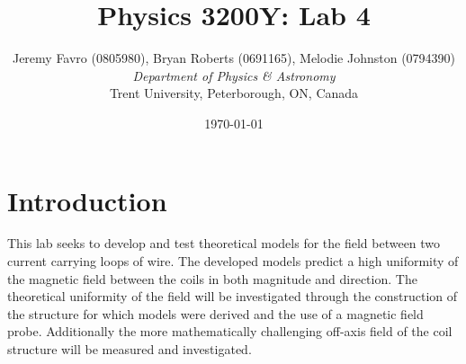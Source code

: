 \documentclass[10pt, twocolumn]{article}
\title{Physics 3200Y: Lab 4}
\author{Jeremy Favro (0805980), Bryan Roberts (0691165), Melodie Johnston (0794390)
 \\\emph{Department of Physics \& Astronomy}\\ Trent University, Peterborough, ON, Canada}
\date{\today}
\theoremstyle{definition}
\begin{document}
\maketitle
\begin{abstract}
    
\end{abstract}
\section{Introduction}
This lab seeks to develop and test theoretical models for the field between two current carrying loops of wire. The developed models predict a high uniformity of the magnetic field between the coils in both magnitude and direction. The theoretical uniformity of the field will be investigated through the construction of the structure for which models were derived and the use of a magnetic field probe.
Additionally the more mathematically challenging off-axis field of the coil structure will be measured and investigated.
\end{document}
